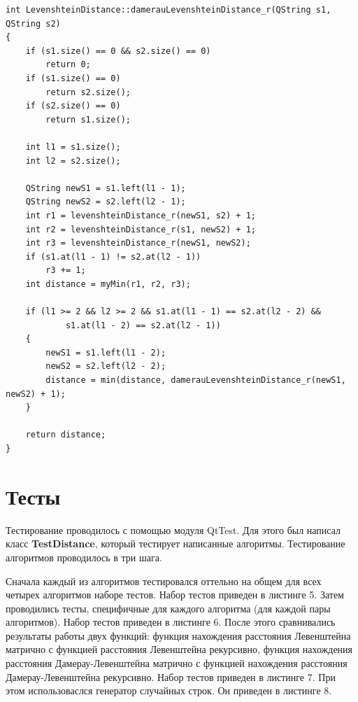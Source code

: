 \documentclass[14pt]{report}
\begin{document}
\begin{lstlisting}[label=some-code,caption=Функция для нахождения расстояния Дамерау-Левенштейна рекурсивно]
int LevenshteinDistance::damerauLevenshteinDistance_r(QString s1, QString s2)
{
    if (s1.size() == 0 && s2.size() == 0)
        return 0;
    if (s1.size() == 0)
        return s2.size();
    if (s2.size() == 0)
        return s1.size();

    int l1 = s1.size();
    int l2 = s2.size();

    QString newS1 = s1.left(l1 - 1);
    QString newS2 = s2.left(l2 - 1);
    int r1 = levenshteinDistance_r(newS1, s2) + 1;
    int r2 = levenshteinDistance_r(s1, newS2) + 1;
    int r3 = levenshteinDistance_r(newS1, newS2);
    if (s1.at(l1 - 1) != s2.at(l2 - 1))
        r3 += 1;
    int distance = myMin(r1, r2, r3);

    if (l1 >= 2 && l2 >= 2 && s1.at(l1 - 1) == s2.at(l2 - 2) &&
            s1.at(l1 - 2) == s2.at(l2 - 1))
    {
        newS1 = s1.left(l1 - 2);
        newS2 = s2.left(l2 - 2);
        distance = min(distance, damerauLevenshteinDistance_r(newS1, newS2) + 1);
    }

    return distance;
}
\end{lstlisting}

\section*{Тесты}

Тестирование проводилось с помощью модуля QtTest.
Для этого был написал класс  {\bf TestDistance}, который тестирует написанные алгоритмы. Тестирование алгоритмов проводилось в три шага.

Сначала каждый из алгоритмов тестировался оттельно на общем для всех четырех алгоритмов наборе тестов. Набор тестов приведен в листинге 5.
Затем проводились тесты, специфичные для каждого алгоритма (для каждой пары алгоритмов). Набор тестов приведен в листинге 6.
После этого сравнивались результаты работы двух функций: функция нахождения расстояния Левенштейна матрично с функцией расстояния Левенштейна рекурсивно, функция нахождения расстояния Дамерау-Левенштейна матрично с функцией нахождения расстояния Дамерау-Левенштейна рекурсивно. Набор тестов приведен в листинге 7. При этом использоваслся генератор случайных строк. Он приведен в листинге 8.
\end{document}
